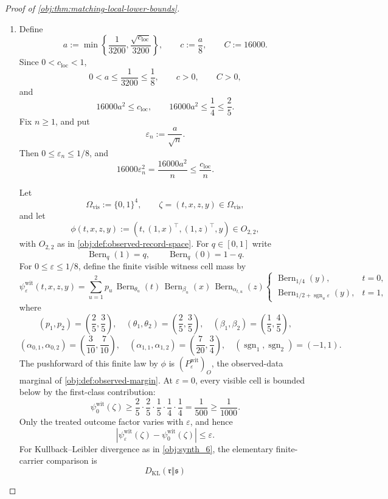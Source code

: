 \begin{proof}[Proof of \cref{obj:thm:matching-local-lower-bounds}]
\begin{enumerate}
\item Define
\[
a:=\min\left\{\frac1{3200},\frac{\sqrt{c_{\mathrm{loc}}}}{3200}\right\},
\qquad
c:=\frac a8,
\qquad
C:=16000 .
\]
Since \(0<c_{\mathrm{loc}}<1\),
\[
0<a\le \frac1{3200}\le\frac18,\qquad c>0,\qquad C>0,
\]
and
\[
16000a^2\le c_{\mathrm{loc}},
\qquad
16000a^2\le \frac14\le\frac25 .
\]
Fix \(n\ge1\), and put
\[
\varepsilon_n:=\frac{a}{\sqrt n}.
\]
Then \(0\le\varepsilon_n\le1/8\), and
\[
16000\varepsilon_n^2
=
\frac{16000a^2}{n}
\le
\frac{c_{\mathrm{loc}}}{n}.
\]

Let
\[
\Omega_{\mathrm{vis}}:=\{0,1\}^4,
\qquad
\zeta=(t,x,z,y)\in\Omega_{\mathrm{vis}},
\]
and let
\[
\phi(t,x,z,y):=(t,(1,x)^\top,(1,z)^\top,y)\in O_{2,2},
\]
with \(O_{2,2}\) as in \cref{obj:def:observed-record-space}.  For \(q\in[0,1]\) write
\[
\operatorname{Bern}_q(1)=q,\qquad
\operatorname{Bern}_q(0)=1-q .
\]
For \(0\le\varepsilon\le1/8\), define the finite visible witness cell mass by
\[
\psi^{\mathrm{wit}}_{\varepsilon}(t,x,z,y)
=
\sum_{u=1}^{2}
p_u\,\operatorname{Bern}_{\theta_u}(t)\,
\operatorname{Bern}_{\beta_u}(x)\,
\operatorname{Bern}_{\alpha_{t,u}}(z)
\begin{cases}
\operatorname{Bern}_{1/4}(y),& t=0,\\
\operatorname{Bern}_{1/2+\operatorname{sgn}_u\varepsilon}(y),& t=1,
\end{cases}
\]
where
\[
(p_1,p_2)=\left(\frac25,\frac35\right),\quad
(\theta_1,\theta_2)=\left(\frac25,\frac35\right),\quad
(\beta_1,\beta_2)=\left(\frac15,\frac45\right),
\]
\[
(\alpha_{0,1},\alpha_{0,2})=\left(\frac3{10},\frac7{10}\right),\quad
(\alpha_{1,1},\alpha_{1,2})=\left(\frac7{20},\frac34\right),\quad
(\operatorname{sgn}_1,\operatorname{sgn}_2)=(-1,1).
\]
The pushforward of this finite law by \(\phi\) is \((P_{\varepsilon}^{\mathrm{wit}})_O\), the observed-data marginal of \cref{obj:def:observed-margin}.  At \(\varepsilon=0\), every visible cell is bounded below by the first-class contribution:
\[
\psi^{\mathrm{wit}}_{0}(\zeta)
\ge
\frac25\cdot\frac25\cdot\frac15\cdot\frac14\cdot\frac14
=
\frac1{500}
\ge
\frac1{1000}.
\]
Only the treated outcome factor varies with \(\varepsilon\), and hence
\[
\left|\psi^{\mathrm{wit}}_{\varepsilon}(\zeta)
-\psi^{\mathrm{wit}}_{0}(\zeta)\right|
\le \varepsilon .
\]
For Kullback--Leibler divergence as in \cref{obj:synth_6}, the elementary finite-carrier comparison is
\[
D_{\mathrm{KL}}(\mathfrak r\Vert\mathfrak s)
\]
\end{enumerate}
\end{proof}
